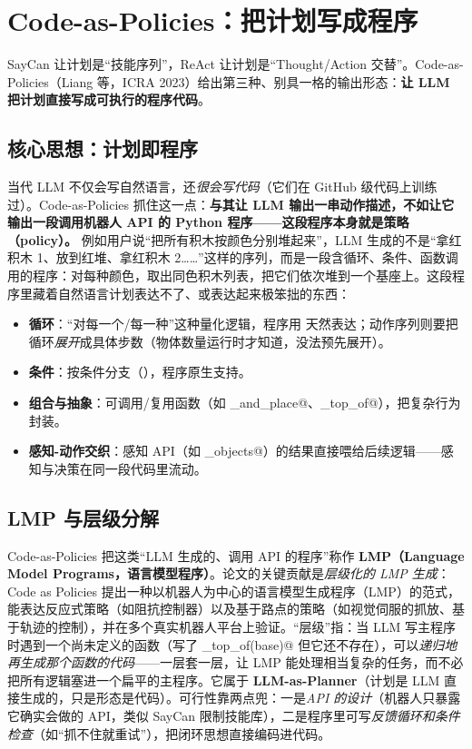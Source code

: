 \section{Code-as-Policies：把计划写成程序}
\label{sec:cap}

SayCan 让计划是“技能序列”，ReAct 让计划是“Thought/Action 交替”。Code-as-Policies（Liang 等，ICRA 2023）给出第三种、别具一格的输出形态：\textbf{让 LLM 把计划直接写成可执行的程序代码}。

\subsection{核心思想：计划即程序}
\label{sec:cap-core}

当代 LLM 不仅会写自然语言，还\emph{很会写代码}（它们在 GitHub 级代码上训练过）。Code-as-Policies 抓住这一点：\textbf{与其让 LLM 输出一串动作描述，不如让它输出一段调用机器人 API 的 Python 程序——这段程序本身就是策略（policy）。} 例如用户说“把所有积木按颜色分别堆起来”，LLM 生成的不是“拿红积木 1、放到红堆、拿红积木 2……”这样的序列，而是一段含循环、条件、函数调用的程序：对每种颜色，取出同色积木列表，把它们依次堆到一个基座上。这段程序里藏着自然语言计划表达不了、或表达起来极笨拙的东西：

\begin{itemize}
  \item \textbf{循环}：“对每一个/每一种”这种量化逻辑，程序用 \verb@for@ 天然表达；动作序列则要把循环\emph{展开}成具体步数（物体数量运行时才知道，没法预先展开）。
  \item \textbf{条件}：按条件分支（\verb@if@），程序原生支持。
  \item \textbf{组合与抽象}：可调用/复用函数（如 \verb@pick_and_place@、\verb@on_top_of@），把复杂行为封装。
  \item \textbf{感知-动作交织}：感知 API（如 \verb@detect_objects@）的结果直接喂给后续逻辑——感知与决策在同一段代码里流动。
\end{itemize}

\subsection{LMP 与层级分解}
\label{sec:cap-lmp}

Code-as-Policies 把这类“LLM 生成的、调用 API 的程序”称作 \textbf{LMP（Language Model Programs，语言模型程序）}。论文的关键贡献是\emph{层级化的 LMP 生成}：Code as Policies 提出一种以机器人为中心的语言模型生成程序（LMP）的范式，能表达反应式策略（如阻抗控制器）以及基于路点的策略（如视觉伺服的抓放、基于轨迹的控制），并在多个真实机器人平台上验证\cite{liang2023codeaspolicies}。“层级”指：当 LLM 写主程序时遇到一个尚未定义的函数（写了 \verb@on_top_of(base)@ 但它还不存在），可以\emph{递归地再生成那个函数的代码}——一层套一层，让 LMP 能处理相当复杂的任务，而不必把所有逻辑塞进一个扁平的主程序。它属于 \textbf{LLM-as-Planner}（计划是 LLM 直接生成的，只是形态是代码）。可行性靠两点兜：一是\emph{API 的设计}（机器人只暴露它确实会做的 API，类似 SayCan 限制技能库），二是程序里可写\emph{反馈循环和条件检查}（如“抓不住就重试”），把闭环思想直接编码进代码。


